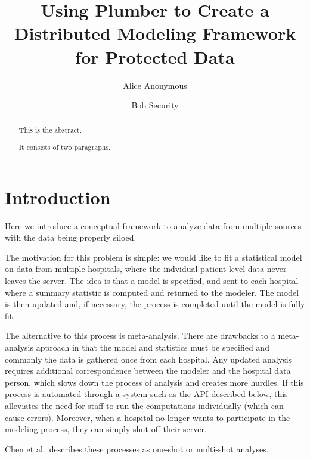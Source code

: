 \documentclass[]{elsarticle} %
\begin{document}
\begin{frontmatter}

  \title{Using Plumber to Create a Distributed Modeling Framework for Protected
Data}
    \author[Some Institute of Technology]{Alice Anonymous}
    \author[Another University]{Bob Security}
  
      \address[Some Institute of Technology]{Department, Street, City, State, Zip}
    \address[Another University]{Department, Street, City, State, Zip}
  
  \begin{abstract}
  This is the abstract.
  
  It consists of two paragraphs.
  \end{abstract}
  
 \end{frontmatter}

\hypertarget{introduction}{%
\section{Introduction}\label{introduction}}

Here we introduce a conceptual framework to analyze data from multiple
sources with the data being properly siloed.

The motivation for this problem is simple: we would like to fit a
statistical model on data from multiple hospitals, where the indvidual
patient-level data never leaves the server. The idea is that a model is
specified, and sent to each hospital where a summary statistic is
computed and returned to the modeler. The model is then updated and, if
necessary, the process is completed until the model is fully fit.

The alternative to this process is meta-analysis. There are drawbacks to
a meta-analysis approach in that the model and statistics must be
specified and commonly the data is gathered once from each hospital. Any
updated analysis requires additional correspondence between the modeler
and the hospital data person, which slows down the process of analysis
and creates more hurdles. If this process is automated through a system
such as the API described below, this alleviates the need for staff to
run the computations individually (which can cause errors). Moreover,
when a hospital no longer wants to participate in the modeling process,
they can simply shut off their server.

Chen et al.~describes these processes as one-shot or multi-shot
analyses.
\end{document}
